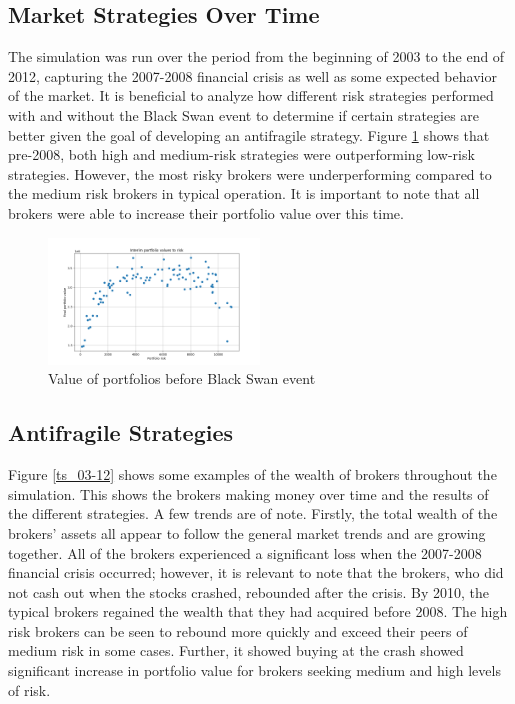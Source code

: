 \documentclass[letterpaper, 11 pt, proceedings]{IEEEtran}
\begin{document}
	\subsection{Market Strategies Over Time}\label{subsec:results_midpoint}
	The simulation was run over the period from the beginning of 2003 to the end of 2012, capturing the 2007-2008 financial crisis as well as some expected behavior of the market. It is beneficial to analyze how different risk strategies performed with and without the Black Swan event to determine if certain strategies are better given the goal of developing an antifragile strategy. Figure \ref{interimRV} shows that pre-2008, both high and medium-risk strategies were outperforming low-risk strategies. However, the most risky brokers were underperforming compared to the medium risk brokers in typical operation. It is important to note that all brokers were able to increase their portfolio value over this time.

	\begin{figure}[h]
		\centering
		\includegraphics[width=0.5\textwidth]{interimRiskToValue.png}
		\caption{Value of portfolios before Black Swan event}
		\label{interimRV}
	\end{figure}
	\FloatBarrier

	\subsection{Antifragile Strategies}\label{subsec:results_end}	
	
	Figure \ref{ts_03-12} shows some examples of the wealth of brokers throughout the simulation. This shows the brokers making money over time and the results of the different strategies. A few trends are of note. Firstly, the total wealth of the brokers' assets all appear to follow the general market trends and are growing together. All of the brokers experienced a significant loss when the 2007-2008 financial crisis occurred; however, it is relevant to note that the brokers, who did not cash out when the stocks crashed, rebounded after the crisis. By 2010, the typical brokers regained the wealth that they had acquired before 2008. The high risk brokers can be seen to rebound more quickly and exceed their peers of medium risk in some cases. Further, it showed buying at the crash showed significant increase in portfolio value for brokers seeking medium and high levels of risk.
	
\end{document}
